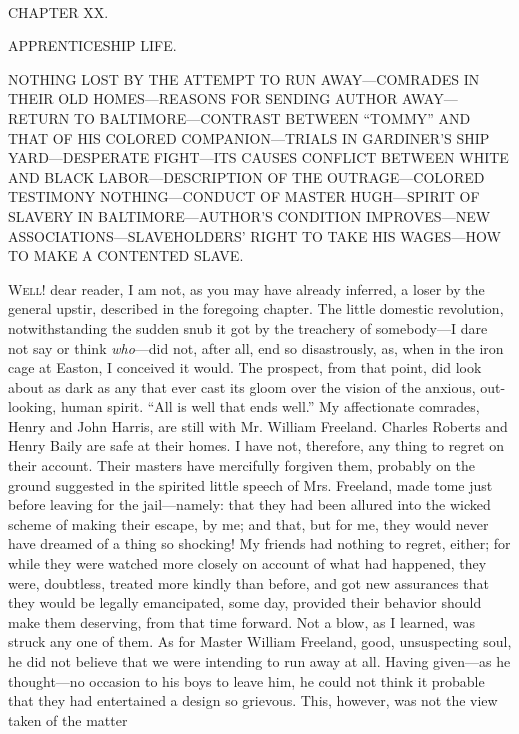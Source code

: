{\protect\hypertarget{304}{}{}}

~

{CHAPTER XX.}

APPRENTICESHIP LIFE.

{NOTHING LOST BY THE ATTEMPT TO RUN AWAY---COMRADES IN THEIR OLD
HOMES---REASONS FOR SENDING AUTHOR AWAY---RETURN TO BALTIMORE---CONTRAST
BETWEEN ``TOMMY'' AND THAT OF HIS COLORED COMPANION---TRIALS IN
GARDINER'S SHIP YARD---DESPERATE FIGHT---ITS CAUSES CONFLICT BETWEEN
WHITE AND BLACK LABOR---DESCRIPTION OF THE OUTRAGE---COLORED TESTIMONY
NOTHING---CONDUCT OF MASTER HUGH---SPIRIT OF SLAVERY IN
BALTIMORE---AUTHOR'S CONDITION IMPROVES---NEW
ASSOCIATIONS---SLAVEHOLDERS' RIGHT TO TAKE HIS WAGES---HOW TO MAKE A
CONTENTED SLAVE.}

\textsc{Well!} dear reader, I am not, as you may have already inferred,
a loser by the general upstir, described in the foregoing chapter. The
little domestic revolution, notwithstanding the sudden snub it got by
the treachery of somebody---I dare not say or think \emph{who}---did
not, after all, end so disastrously, as, when in the iron cage at
Easton, I conceived it would. The prospect, from that point, did look
about as dark as any that ever cast its gloom over the vision of the
anxious, out-looking, human spirit. ``All is well that ends well.'' My
affectionate comrades, Henry and John Harris, are still with Mr. William
Freeland. Charles Roberts and Henry Baily are safe at their homes. I
have not, therefore, any thing to regret on their account. Their masters
have mercifully forgiven them, probably on the ground suggested in the
spirited little speech of Mrs. Freeland, made tome just before
{\protect\hypertarget{305}{}{}}leaving for the jail---namely: that they
had been allured into the wicked scheme of making their escape, by me;
and that, but for me, they would never have dreamed of a thing so
shocking! My friends had nothing to regret, either; for while they were
watched more closely on account of what had happened, they were,
doubtless, treated more kindly than before, and got new assurances that
they would be legally emancipated, some day, provided their behavior
should make them deserving, from that time forward. Not a blow, as I
learned, was struck any one of them. As for Master William Freeland,
good, unsuspecting soul, he did not believe that we were intending to
run away at all. Having given---as he thought---no occasion to his boys
to leave him, he could not think it probable that they had entertained a
design so grievous. This, however, was not the view taken of the matter
